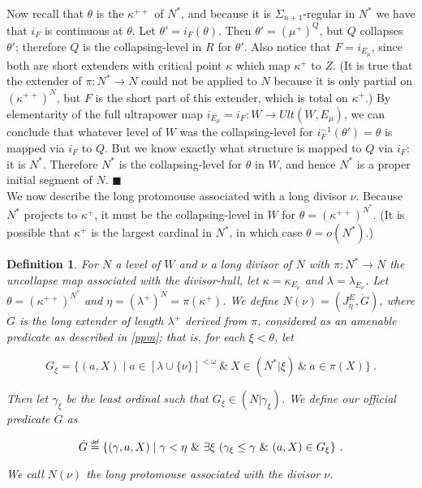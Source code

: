 \documentclass[12pt]{article}
\newtheorem{defn}[thm]{Definition}
\newcommand\defeq{\mathrel{\overset{\makebox[0pt]{\mbox{\normalfont\tiny\sffamily def}}}{=}}}
\begin{document}
Now recall that $\theta$ is the $\kappa^{++}$ of $N^*$, and because it is $\Sigma_{n+1}$-regular in $N^*$ we have that $i_F$ is continuous at $\theta$.  Let $\theta' = i_F (\theta )$.  Then $\theta' = ( \mu^+ )^{Q}$, but $Q$ collapses $\theta'$; therefore $Q$ is the collapsing-level in $R$ for $\theta'$.  Also notice that $F = i_{E_\mu}$, since both are short extenders with critical point $\kappa$ which map $\kappa^+$ to $Z$.  (It is true that the extender of $\pi : N^* \longrightarrow N$ could not be applied to $N$ because it is only partial on $(\kappa^{++})^N$, but $F$ is the short part of this extender, which is total on $\kappa^+$.)  By elementarity of the full ultrapower map $i_{E_\mu} = i_F : W \longrightarrow Ult ( W , E_\mu )$, we can conclude that whatever level of $W$ was the collapsing-level for $i_F^{-1} (\theta') = \theta$ is mapped via $i_F$ to $Q$.  But we know exactly what structure is mapped to $Q$ via $i_F$: it is $N^*$.  Therefore $N^*$ is the collapsing-level for $\theta$ in $W$, and hence $N^*$ is a proper initial segment of $N$. $\blacksquare$\\









We now describe the long protomouse associated with a long divisor $\nu$.  Because $N^*$ projects to $\kappa^+$, it must be the collapsing-level in $W$ for $\theta = (\kappa^{++} )^{N^*}$.  (It is possible that $\kappa^+$ is the largest cardinal in $N^*$, in which case $\theta = o(N^* )$.)\\


\begin{defn} \label{protomouse associated with long divisor}
For $N$ a level of $W$ and $\nu$ a long divisor of $N$ with $\pi : N^* \longrightarrow N$ the uncollapse map associated with the divisor-hull, let $\kappa = \kappa_{E_\nu}$ and $\lambda = \lambda_{E_\nu}$.  Let $\theta = (\kappa^{++} )^{N^*}$ and $\eta = ( \lambda^+)^{N} = \pi (\kappa^+ )$.  We define $N (\nu) = (J_\eta^E , \dot{G} )$, where $\dot{G}$ is the long extender of length $\lambda^+$ derived from $\pi$, considered as an amenable predicate as described in \ref{ppm}; that is, for each $\xi < \theta$, let
		
\[
G_\xi = \{ (a, X) \mid a \in [ \lambda \cup \{ \nu \} ] ^{< \omega} \ \& \ X \in (N^* | \xi ) \ \& \ a \in \pi (X) \} \ .
\]
	
	Then let $\gamma_\xi$ be the least ordinal such that $G_\xi \in (N | \gamma_\xi )$.   We define our official predicate $\dot{G}$ as

\[
\dot{G} \defeq \{ (\gamma , a, X) \mid \gamma < \eta \ \& \ \exists \xi \ ( \gamma_\xi \leq \gamma \ \& \ (a, X) \in G_\xi \} \ .
\]


 We call $N (\nu)$ the long protomouse associated with the divisor $\nu$.
\end{defn}
\end{document}
